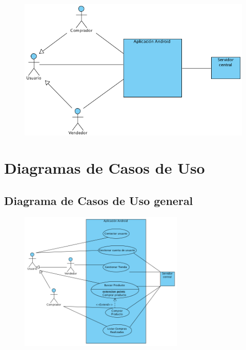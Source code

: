 \begin{figure}[H]
  \centering
   
    \includegraphics[width=1\textwidth]{imagenes/analisis/diagrama-contexto.png}
	\label{fig:casos-de-uso}
\end{figure}

\section{Diagramas de Casos de Uso}

\subsection{Diagrama de Casos de Uso general}

\begin{figure}[H]
  \centering
    \includegraphics[width=0.7\textwidth]{imagenes/analisis/casos-uso-general.png}
	\label{fig:casos-de-uso}
\end{figure}

